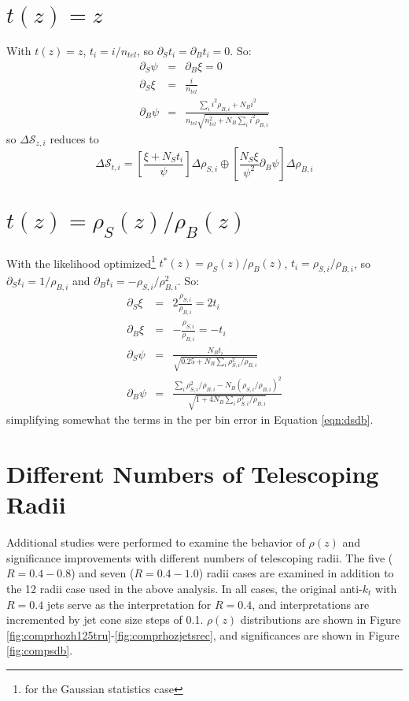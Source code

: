 \section{$t\left(z\right)=z$}
With $t\left(z\right)=z$, $t_i=i/n_{tel}$, so $\partial_S t_i=\partial_B t_i=0$. So:
\begin{eqnarray*}
  \partial_S \psi&=&\partial_B \xi=0\\
  \partial_S\xi&=&\frac{i}{n_{tel}}\\
  \partial_B\psi&=&\frac{\sum_ii^2\rho_{B,i}+N_Bi^2}{n_{tel}\sqrt{n_{tel}^2+N_B\sum_ii^2\rho_{B,i}}}
\end{eqnarray*}
so  $\Delta\mathscr{S}_{z,i}$ reduces to
\begin{equation}
\Delta\mathscr{S}_{t,i}=\left[\frac{\xi+N_St_i}{\psi}\right]\Delta\rho_{S,i}\oplus\left[\frac{N_S\xi}{\psi^2}\partial_B \psi\right]\Delta\rho_{B,i}
\label{eqn:dsdb}
\end{equation}

\section{$t\left(z\right)=\rho_{S}\left(z\right)/\rho_{B}\left(z\right)$}
With the likelihood optimized\footnote{for the Gaussian statistics case} $t^*\left(z\right)=\rho_S\left(z\right)/\rho_B\left(z\right)$, $t_i=\rho_{S,i}/\rho_{B,i}$, so $\partial_St_i=1/\rho_{B,i}$ and $\partial_B t_i=-\rho_{S,i}/\rho_{B,i}^2$. So:
\begin{eqnarray*}
  \partial_S\xi&=&2\frac{\rho_{S,i}}{\rho_{B,i}}=2t_i\\
  \partial_B\xi&=&-\frac{\rho_{S,i}}{\rho_{B,i}}=-t_i\\
  \partial_S\psi&=&\frac{N_Bt_i}{\sqrt{0.25+N_B\sum_i\rho_{S,i}^2/\rho_{B,i}}}\\
  \partial_B\psi&=&\frac{\sum_i\rho_{S,i}^2/\rho_{B,i}-N_B\left(\rho_{S,i}/\rho_{B,i}\right)^2}{\sqrt{1+4N_B\sum_i\rho_{S,i}^2/\rho_{B,i}}}
\end{eqnarray*}
simplifying somewhat the terms in the per bin error in Equation \ref{eqn:dsdb}.

\clearpage

\section{Different Numbers of Telescoping Radii}
\label{sec:multrad}
Additional studies were performed to examine the behavior of $\rho\left(z\right)$ and significance improvements with different numbers of telescoping radii.  The five ($R=0.4-0.8$) and seven ($R=0.4-1.0$) radii cases are examined in addition to the 12 radii case used in the above analysis.  In all cases, the original anti-$k_t$ with $R=0.4$ jets serve as the interpretation for $R=0.4$, and interpretations are incremented by jet cone size steps of 0.1.  $\rho\left(z\right)$ distributions are shown in Figure \ref{fig:comprhozh125tru}-\ref{fig:comprhozjetsrec}, and significances are shown in Figure \ref{fig:compsdb}.

